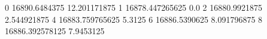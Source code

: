 0 16890.6484375 12.201171875
1 16878.447265625 0.0
2 16880.9921875 2.544921875
4 16883.759765625 5.3125
6 16886.5390625 8.091796875
8 16886.392578125 7.9453125
